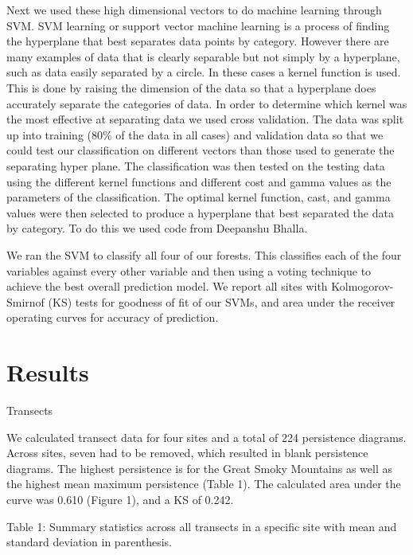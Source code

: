 \documentclass[10pt]{article}
\begin{document}
Next we used these high dimensional vectors to do machine learning through SVM. SVM learning or support vector machine learning is a process of finding the hyperplane that best separates data points by category. However there are many examples of data that is clearly separable but not simply by a hyperplane, such as data easily separated by a circle. In these cases a kernel function is used. This is done by raising the dimension of the data so that a hyperplane does accurately separate the categories of data. In order to determine which kernel was the most effective at separating data we used cross validation. The data was split up into training ($80\%$ of the data in all cases) and validation data so that we could test our classification on different vectors than those used to generate the separating hyper plane. The classification was then tested on the testing data using the different kernel functions and different cost and gamma values as the parameters of the classification. The optimal kernel function, cast, and gamma values were then selected to produce a hyperplane that best separated the data by category. To do this we used code from Deepanshu Bhalla.

We ran the SVM to classify all four of our forests. This classifies each of the four variables against every other variable and then using a voting technique to achieve the best overall prediction model. We report all sites with Kolmogorov-Smirnof (KS) tests for goodness of fit of our SVMs, and area under the receiver operating curves for accuracy of prediction.

\section*{Results}
Transects

We calculated transect data for four sites and a total of 224 persistence diagrams. Across sites, seven had to be removed, which resulted in blank persistence diagrams. The highest persistence is for the Great Smoky Mountains as well as the highest mean maximum persistence (Table 1). The calculated area under the curve was 0.610 (Figure 1), and a KS of 0.242.

Table 1: Summary statistics across all transects in a specific site with mean and standard deviation in parenthesis.
\end{document}
